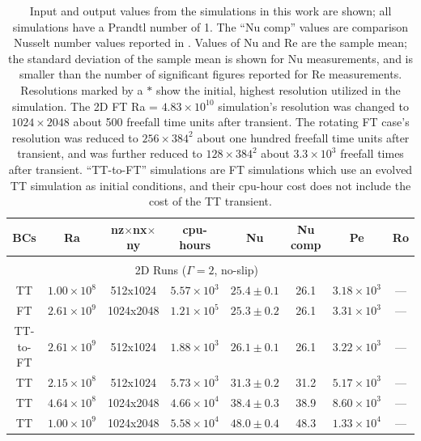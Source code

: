 \documentclass[aps, pre, onecolumn, nofootinbib, notitlepage, groupedaddress, amsfonts, amssymb, amsmath, longbibliography, superscriptaddress]{revtex4-1}
\begin{document}
\begin{table}[ht]
\caption{
	Input and output values from the simulations in this work are shown; all simulations have a Prandtl number of 1.
	The ``Nu comp'' values are comparison Nusselt number values reported in \cite{zhu&all2018}.
	Values of Nu and Re are the sample mean; the standard deviation of the sample mean is shown for Nu measurements, and is smaller than the number of significant figures reported for Re measurements.
	Resolutions marked by a $*$ show the initial, highest resolution utilized in the simulation.
	The 2D FT Ra = $4.83 \times 10^{10}$ simulation's resolution was changed to $1024\times2048$ about 500 freefall time units after transient.
	The rotating FT case's resolution was reduced to $256\times384^2$ about one hundred freefall time units after transient, and was further reduced to $128\times384^2$ about $3.3\times 10^3$ freefall times after transient.
	``TT-to-FT'' simulations are FT simulations which use an evolved TT simulation as initial conditions, and their cpu-hour cost does not include the cost of the TT transient.
}
\setlength{\tabcolsep}{8pt}
\label{table:speed}
\begin{center}
\begin{tabularx}{\textwidth}{c c c c c c c c}
\hline																	
BCs	&	Ra	&	nz$\times$nx$\times$ny	&	cpu-hours &	Nu	&	Nu comp	&	Pe  & Ro \\
\hline \hline \multicolumn{6}{c}{\vspace{-0.2cm}}\\
\multicolumn{7}{c}{\vspace{0.1cm}2D Runs ($\Gamma = 2$, no-slip)} \\
\hline
TT			&	$1.00 \times 10^8$		&	512x1024	&	$5.57 \times 10^3$	&	$25.4 \pm 0.1$	&	26.1	&	$3.18 \times 10^3$ & --- \\
FT			&	$2.61 \times 10^9$		&	1024x2048	&	$1.21 \times 10^5$	&	$25.3 \pm 0.2$	&	26.1	&	$3.31 \times 10^3$ & --- \\
TT-to-FT	&	$2.61 \times 10^9$		&	512x1024	&	$1.88 \times 10^3$	&	$26.1 \pm 0.1$	&	26.1	&	$3.22 \times 10^3$ & --- \\
TT			&	$2.15 \times 10^8$		&	512x1024	&	$5.73 \times 10^3$	&	$31.3 \pm 0.2$	&	31.2	&	$5.17 \times 10^3$ & --- \\
TT			&	$4.64 \times 10^8$		&	1024x2048	&	$4.66 \times 10^4$	&	$38.4 \pm 0.3$	&	38.9	&	$8.60 \times 10^3$ & --- \\
TT			&	$1.00 \times 10^9$		&	1024x2048	&	$5.58 \times 10^4$	&	$48.0 \pm 0.4$	&	48.3	&	$1.33 \times 10^4$ & --- \\

\end{tabularx}
\end{center}
\end{table}
\end{document}
